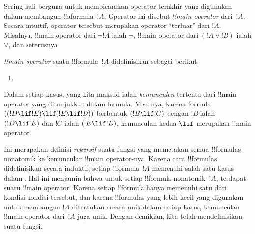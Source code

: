 \documentclass[../../../include/open-logic-section]{subfiles}
\begin{document}


\begin{explain}
Sering kali berguna untuk membicarakan operator terakhir yang digunakan
dalam membangun !!a{formula}~$!A$. Operator ini disebut \emph{!!{main
  operator}} dari~$!A$. Secara intuitif, operator tersebut merupakan
operator ``terluar'' dari $!A$. Misalnya, !!{main operator} dari $\lnot !A$
ialah $\lnot$, !!{main operator} dari $(!A \lor !B)$ ialah $\lor$, dan
seterusnya.
\end{explain}


\begin{defn}
\emph{!!{main operator}} suatu !!{formula}~$!A$ didefinisikan sebagai
berikut:
\begin{enumerate}
\item {}







\end{enumerate}
\end{defn}

Dalam setiap kasus, yang kita maksud ialah \emph{kemunculan} tertentu dari
!!{main operator} yang ditunjukkan dalam formula. Misalnya, karena formula
$((!D \lif !E) \lif (!E \lif !D))$ berbentuk $(!B \lif !C)$ dengan $!B$
ialah $(!D \lif !E)$ dan $!C$ ialah $(!E \lif !D)$, kemunculan kedua
$\lif$ merupakan !!{main operator}.

\begin{explain}
Ini merupakan definisi \emph{rekursif} suatu fungsi yang memetakan semua
!!{formula}s nonatomik ke kemunculan !!{main operator}-nya. Karena cara
!!{formula}s didefinisikan secara induktif, setiap !!{formula}~$!A$
memenuhi salah satu kasus dalam . Hal ini menjamin bahwa
untuk setiap !!{formula} nonatomik~$!A$, terdapat suatu !!{main operator}.
Karena setiap !!{formula} hanya memenuhi satu dari kondisi-kondisi tersebut,
dan karena !!{formula}s yang lebih kecil yang digunakan untuk membangun
$!A$ ditentukan secara unik dalam setiap kasus, kemunculan !!{main
  operator} dari~$!A$ juga unik. Dengan demikian, kita telah mendefinisikan
suatu fungsi.
\end{explain}
\end{document}
